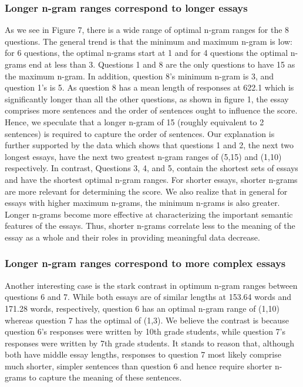 \documentclass[10pt,letterpaper]{article}
\begin{document}
\subsubsection{Longer n-gram ranges correspond to longer essays}
As we see in Figure 7, there is a wide range of optimal n-gram ranges for the 8 questions. The general trend is that the minimum and maximum n-gram is low: for 6 questions, the optimal n-grams start at 1 and for 4 questions the optimal n-grams end at less than 3. Questions 1 and 8 are the only questions to have 15 as the maximum n-gram. In addition, question 8's minimum n-gram is 3, and question 1's is 5. As question 8 has a mean length of responses at 622.1 which is significantly longer than all the other questions, as shown in figure 1, the essay comprises more sentences and the order of sentences ought to influence the score. Hence, we speculate that a longer n-gram of 15 (roughly equivalent to 2 sentences) is required to capture the order of sentences. 
Our explanation is further supported by the data which shows that questions 1 and 2, the next two longest essays, have the next two greatest n-gram ranges of (5,15) and (1,10) respectively. 
In contrast, Questions 3, 4, and 5, contain the shortest sets of essays and have the shortest optimal n-gram ranges. For shorter essays, shorter n-grams are more relevant for determining the score.
We also realize that in general for essays with higher maximum n-grams, the minimum n-grams is also greater. Longer n-grams become more effective at characterizing the important semantic features of the essays. Thus, shorter n-grams correlate less to the meaning of the essay as a whole and their roles in providing meaningful data decrease. 

\subsubsection{Longer n-gram ranges correspond to more complex essays}
Another interesting case is the stark contrast in optimum n-gram ranges between questions 6 and 7. While both essays are of similar lengths at 153.64 words and 171.28 words, respectively, question 6 has an optimal n-gram range of (1,10) whereas question 7 has the optimal of (1,3). We believe the contrast is because question 6's responses were written by 10th grade students, while question 7's responses were written by 7th grade students. It stands to reason that, although both have middle essay lengths, responses to question 7 most likely comprise much shorter, simpler sentences than question 6 and hence require shorter n-grams to capture the meaning of these sentences.
\end{document}
